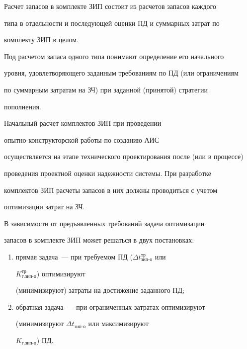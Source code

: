      Расчет запасов в комплекте ЗИП состоит из расчетов запасов каждого 


типа в отдельности и последующей оценки ПД и суммарных затрат по 


комплекту ЗИП в целом.


     


     Под расчетом запаса одного типа понимают определение его начального 


уровня, удовлетворяющего заданным требованиям по ПД (или ограничениям 


по суммарным затратам на ЗЧ) при заданной (принятой) стратегии 


пополнения.


     


     Начальный расчет комплектов ЗИП при проведении 


     опыт\-но-кон\-ст\-рук\-тор\-ской работы по созданию АИС 


осуществляется на этапе технического проектирования после (или в процессе) 


проведения проектной оценки надежности системы. При разработке 


комплектов ЗИП расчеты запасов в них должны проводиться с учетом 


оптимизации затрат на ЗЧ.


     


     В зависимости от предъявленных требований задача оптимизации 


запасов в комплекте ЗИП может решаться в двух постановках:


     \begin{enumerate}[(1)]


     \item прямая задача~--- при требуемом ПД ($\Delta 


t^{\mathrm{тр}}_{\mathrm{зип\mbox{-}о}}$ или 


$K^{\mathrm{тр}}_{\mathrm{г.зип\mbox{-}о}}$) оптимизируют 


(минимизируют) затраты на достижение заданного ПД;


     \item обратная задача~--- при ограниченных затратах оптимизируют 


(минимизируют $\Delta t_{\mathrm{зип\mbox{-}о}}$ или максимизируют 


$K_{\mathrm{г.зип\mbox{-}о}}$) ПД.


     \end{enumerate}



